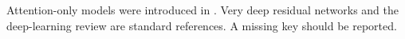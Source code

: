 \documentclass{article}
\begin{document}
Attention-only models were introduced in \cite{vaswani2017attention,vaswani2017arxiv}.
Very deep residual networks \citep{he2016deep} and the deep-learning review \cite{lecun2015deep} are standard references.
A missing key \cite{nokey2020} should be reported.


\end{document}
